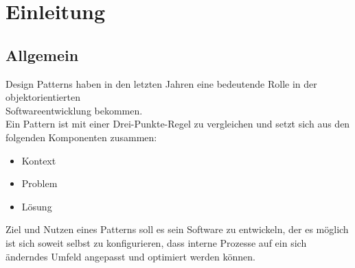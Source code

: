 \documentclass[a4paper]{article}
\begin{document}
\newpage
\section{Einleitung}
\subsection{Allgemein}
Design Patterns haben in den letzten Jahren eine bedeutende Rolle in der objektorientierten\\
Softwareentwicklung bekommen.\\
Ein Pattern ist mit einer Drei-Punkte-Regel zu vergleichen und setzt sich aus den folgenden Komponenten zusammen:
\begin{itemize}
	\item Kontext
	\item Problem
	\item Lösung
\end{itemize}
Ziel und Nutzen eines Patterns soll es sein Software zu entwickeln, der es möglich ist sich soweit selbst zu konfigurieren,
dass interne Prozesse auf ein sich änderndes Umfeld angepasst und optimiert werden können.\\
\end{document}
